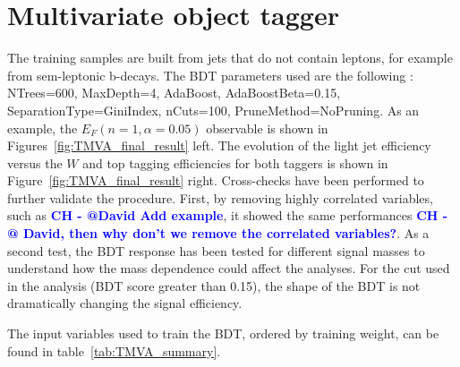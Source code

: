 \documentclass[a4paper,11pt]{article}
\newcommand{\CH}[1] {\textbf{\textcolor{blue}{CH - #1}}}
\newcommand*{\Zptt}{\ensuremath{Z^{\prime} \rightarrow \ttbar}}
\newcommand*{\rsg}{\ensuremath{G_{RS} \rightarrow W^+W^-}}
\newcommand*{\ttbar}{\ensuremath{t\bar{t}}}
\begin{document}
\section{Multivariate object tagger}%
\label{sec:app:mva}
The training samples are built from jets that do not contain leptons, for example from sem-leptonic b-decays.
The BDT parameters used are the following : NTrees=600, MaxDepth=4, AdaBoost, AdaBoostBeta=0.15, SeparationType=GiniIndex, nCuts=100, PruneMethod=NoPruning.
As an example, the $E_{F}(n=1,\alpha=0.05)$ observable is shown in Figures~\ref{fig:TMVA_final_result} left.
The evolution of the light jet efficiency versus the $W$ and top tagging efficiencies for both taggers is shown in Figure~\ref{fig:TMVA_final_result} right.
Cross-checks have been performed to further validate the procedure. First, by removing highly correlated variables, such as \CH{@David Add example}, it showed the same performances \CH{@ David, then why don't we remove the correlated variables?}.
As a second test, the BDT response has been tested for different signal masses to understand how the mass dependence could affect the analyses. For the cut used in the analysis (BDT score greater than 0.15), the shape of the BDT is not dramatically changing the signal efficiency.%

The input variables used to train the BDT, ordered by training weight, can be found in table~\ref{tab:TMVA_summary}.
\end{document}
